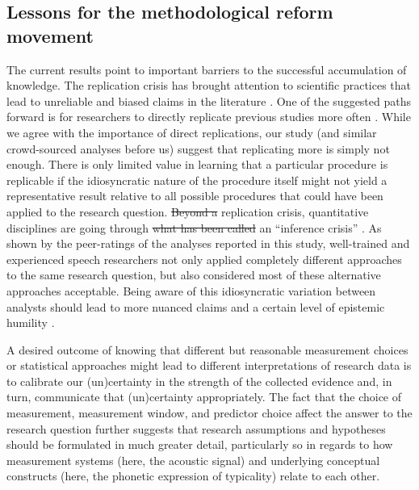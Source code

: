 \documentclass[Review,times,sageh]{sagej}
\providecommand{\DIFaddtex}[1]{{\protect\color{blue}\uwave{#1}}} %
\providecommand{\DIFdeltex}[1]{{\protect\color{red}\sout{#1}}}                      %
\providecommand{\DIFaddbegin}{} %
\providecommand{\DIFaddend}{} %
\providecommand{\DIFdelbegin}{} %
\providecommand{\DIFdelend}{} %
\providecommand{\DIFadd}[1]{\texorpdfstring{\DIFaddtex{#1}}{#1}} %
\providecommand{\DIFdel}[1]{\texorpdfstring{\DIFdeltex{#1}}{}} %
\begin{document}
\hypertarget{lessons-for-the-methodological-reform-movement}{%
\subsection{Lessons for the methodological reform movement}\label{lessons-for-the-methodological-reform-movement}}

The current results point to important barriers to the successful accumulation of knowledge.
The replication crisis has brought attention to scientific practices that lead to unreliable and biased claims in the literature \citep{vazire2017quality, fidler2018reproducibility}.
One of the suggested paths forward is for researchers to directly replicate previous studies more often \citep{open2015estimating, camerer2018evaluating}.
While we agree with the importance of direct replications, our study (and similar crowd-sourced analyses before us) suggest that replicating more is simply not enough.
There is only limited value in learning that a particular procedure is replicable if the idiosyncratic nature of the procedure itself might not yield a representative result relative to all possible procedures that could have been applied to the research question.
\DIFdelbegin \DIFdel{Beyond a }\DIFdelend \DIFaddbegin \DIFadd{Thus beyond a mere }\DIFaddend replication crisis, quantitative disciplines are going through \DIFdelbegin \DIFdel{what has been called }\DIFdelend an ``inference crisis'' \citep{rotello2015more, starns2019assessing}.
As shown by the peer-ratings of the analyses reported in this study, well-trained and experienced speech researchers not only applied completely different approaches to the same research question, but also considered most of these alternative approaches acceptable.
Being aware of this idiosyncratic variation between analysts should lead to more nuanced claims and a certain level of epistemic humility \citep[see][ for an overview of the concept]{campbell1975}.

A desired outcome of knowing that different but reasonable measurement choices or statistical approaches might lead to different interpretations of research data is to calibrate our (un)certainty in the strength of the collected evidence and, in turn, communicate that (un)certainty appropriately.
The fact that the choice of measurement, measurement window, and predictor choice affect the answer to the research question further suggests that research assumptions and hypotheses should be formulated in much greater detail, particularly so in regards to how measurement systems (here, the acoustic signal) and underlying conceptual constructs (here, the phonetic expression of typicality) relate to each other.
\end{document}

